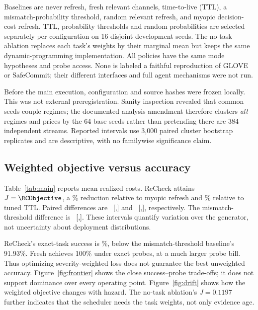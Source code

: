 \documentclass[10pt,letterpaper]{article}
\begin{document}
Baselines are never refresh, fresh relevant channels, time-to-live (TTL), a mismatch-probability threshold, random relevant refresh, and myopic decision-cost refresh. TTL, probability thresholds and random probabilities are selected separately per configuration on 16 disjoint development seeds. The no-task ablation replaces each task's weights by their marginal mean but keeps the same dynamic-programming implementation. All policies have the same mode hypotheses and probe access. None is labeled a faithful reproduction of GLOVE or SafeCommit; their different interfaces and full agent mechanisms were not run.

Before the main execution, configuration and source hashes were frozen locally. This was not external preregistration. Sanity inspection revealed that common seeds couple regimes; the documented analysis amendment therefore clusters \emph{all} regimes and prices by the 64 base seeds rather than pretending there are 384 independent streams. Reported intervals use 3,000 paired cluster bootstrap replicates and are descriptive, with no familywise significance claim.

\begin{table}[t]
\centering
\caption{Controlled main study. Probes include startup and are per task. Success is unweighted; loss is (\ref{eq:loss}).}
\label{tab:main}
{\fontsize{9}{11}\selectfont\setlength{\tabcolsep}{3pt}}
\end{table}

\subsection{Weighted objective versus accuracy}
Table~\ref{tab:main} reports mean realized costs. ReCheck attains $J=\RCObjective$, a \RCReductionMyopic\% reduction relative to myopic refresh and \RCReductionTTL\% relative to tuned TTL. Paired differences are \RCDiffMyopic\ [\RCLowMyopic,\RCHighMyopic] and \RCDiffTTL\ [\RCLowTTL,\RCHighTTL], respectively. The mismatch-threshold difference is \RCDiffEntropy\ [\RCLowEntropy,\RCHighEntropy]. These intervals quantify variation over the generator, not uncertainty about deployment distributions.

ReCheck's exact-task success is \RCSuccess\%, below the mismatch-threshold baseline's 91.93\%. Fresh achieves 100\% under exact probes, at a much larger probe bill. Thus optimizing severity-weighted loss does not guarantee the best unweighted accuracy. Figure~\ref{fig:frontier} shows the close success--probe trade-offs; it does not support dominance over every operating point. Figure~\ref{fig:drift} shows how the weighted objective changes with hazard. The no-task ablation's $J=0.1197$ further indicates that the scheduler needs the task weights, not only evidence age.
\end{document}
